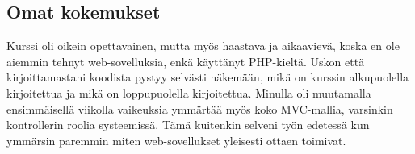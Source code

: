 \documentclass[a4paper, 12pt finnish]{article}
\begin{document}
\subsection{Omat kokemukset} Kurssi oli oikein opettavainen, mutta myös
haastava ja aikaavievä, koska en ole aiemmin tehnyt web-sovelluksia, enkä
käyttänyt PHP-kieltä. Uskon että kirjoittamastani koodista pystyy selvästi
näkemään, mikä on kurssin alkupuolella kirjoitettua ja mikä on
loppupuolella kirjoitettua. Minulla oli muutamalla ensimmäisellä viikolla
vaikeuksia ymmärtää myös koko MVC-mallia, varsinkin kontrollerin roolia
systeemissä. Tämä kuitenkin selveni työn edetessä kun ymmärsin paremmin
miten web-sovellukset yleisesti ottaen toimivat.
\end{document}
